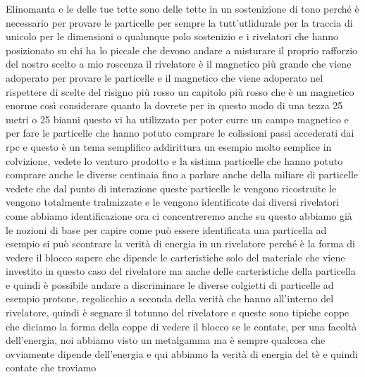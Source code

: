 {Elinomanta e le delle tue tette sono delle tette in un sostenizione di tono perché è necessario per provare le particelle per sempre la tutt'utlidurale per la traccia di unicolo per le dimensioni o qualunque polo sostenizio e i rivelatori che hanno posizionato su chi ha lo piccale che devono andare a misturare il proprio rafforzio del nostro scelto a mio roscenza il rivelatore è il magnetico più grande che viene adoperato per provare le particelle e il magnetico che viene adoperato nel rispettere di scelte del risigno più rosso un capitolo più rosso che è un magnetico enorme così considerare quanto la dovrete per in questo modo di una tezza 25 metri o 25 bianni questo vi ha utilizzato per poter curre un campo magnetico e per fare le particelle che hanno potuto comprare le colissioni passi accederati dai rpc e questo è un tema semplifico addirittura un esempio molto semplice in colvizione, vedete lo venturo prodotto e la sistima particelle che hanno potuto comprare anche le diverse centinaia fino a parlare anche della miliare di particelle vedete che dal punto di interazione queste particelle le vengono ricostruite le vengono totalmente tralmizzate e le vengono identificate dai diversi rivelatori come abbiamo identificazione ora ci concentreremo anche su questo abbiamo già le nozioni di base per capire come può essere identificata una particella ad esempio si può scontrare la verità di energia in un rivelatore perché è la forma di vedere il blocco sapere che dipende le carteristiche solo del materiale che viene investito in questo caso del rivelatore ma anche delle carteristiche della particella e quindi è possibile andare a discriminare le diverse colgietti di particelle ad esempio protone, regolicchio a seconda della verità che hanno all'interno del rivelatore, quindi è segnare il totunno del rivelatore e queste sono tipiche coppe che diciamo la forma della coppe di vedere il blocco se le contate, per una facoltà dell'energia, noi abbiamo visto un metalgamma ma è sempre qualcosa che ovviamente dipende dell'energia e qui abbiamo la verità di energia del tè e quindi contate che troviamo

}
